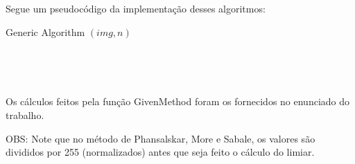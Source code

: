 \documentclass[12pt, letterpaper]{article}
\begin{document}
    Segue um pseudocódigo da implementação desses algoritmos:
    \begin{algorithm}
    \caption{Generic Algorithm $(img, n)$}
    \begin{algorithmic}
                \\

                \Else
                \EndIf
            \EndFor
        \EndFor
        \\
    \end{algorithmic}
    \end{algorithm}

    Os cálculos feitos pela função GivenMethod foram os fornecidos no enunciado do trabalho. 

    OBS: Note que no método de Phansalskar, More e Sabale, os valores são divididos por 255 (normalizados) antes que seja feito o cálculo do limiar.

\newpage
\end{document}
